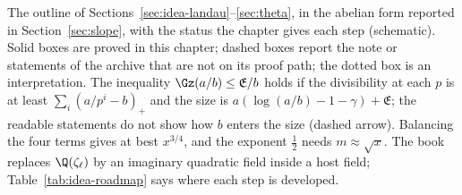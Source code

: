 \caption{The outline of
Sections~\ref{sec:idea-landau}--\ref{sec:theta}, in the abelian form
reported in Section~\ref{sec:slope}, with the status the chapter gives
each step (schematic). Solid boxes are proved in this chapter; dashed
boxes report the note \cite{AlpogeRemark2026} or statements of the
archive \cite{AlpogeArchive2026} that are not on its proof path; the
dotted box is an interpretation. The inequality
$\Gz(a/b)\le\mathfrak E/b$ holds if the divisibility at each $p$ is
at least $\sum_i(a/p^i-b)_+$ and the size is $a(\log(a/b)-1-\gamma)+\mathfrak E$; the readable
statements do not show how $b$ enters the size (dashed arrow).
Balancing the four terms gives at best $x^{3/4}$, and the exponent
$\frac12$ needs $m\approx\sqrt x$. The book replaces $\Q(\zeta_\ell)$
by an imaginary quadratic field inside a host field;
Table~\ref{tab:idea-roadmap} says where each step is developed.}
\label{fig:outline-status}
